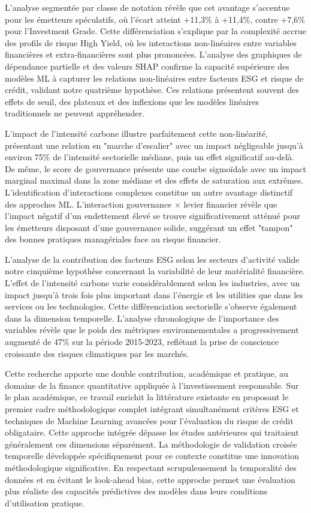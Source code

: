 L'analyse segmentée par classe de notation révèle que cet avantage s'accentue pour les émetteurs spéculatifs, où l'écart atteint +11,3\% à +11,4\%, contre +7,6\% pour l'Investment Grade. Cette différenciation s'explique par la complexité accrue des profils de risque High Yield, où les interactions non-linéaires entre variables financières et extra-financières sont plus prononcées. L'analyse des graphiques de dépendance partielle et des valeurs SHAP confirme la capacité supérieure des modèles ML à capturer les relations non-linéaires entre facteurs ESG et risque de crédit, validant notre quatrième hypothèse. Ces relations présentent souvent des effets de seuil, des plateaux et des inflexions que les modèles linéaires traditionnels ne peuvent appréhender.

L'impact de l'intensité carbone illustre parfaitement cette non-linéarité, présentant une relation en "marche d'escalier" avec un impact négligeable jusqu'à environ 75\% de l'intensité sectorielle médiane, puis un effet significatif au-delà. De même, le score de gouvernance présente une courbe sigmoïdale avec un impact marginal maximal dans la zone médiane et des effets de saturation aux extrêmes. L'identification d'interactions complexes constitue un autre avantage distinctif des approches ML. L'interaction gouvernance × levier financier révèle que l'impact négatif d'un endettement élevé se trouve significativement atténué pour les émetteurs disposant d'une gouvernance solide, suggérant un effet "tampon" des bonnes pratiques managériales face au risque financier.

L'analyse de la contribution des facteurs ESG selon les secteurs d'activité valide notre cinquième hypothèse concernant la variabilité de leur matérialité financière. L'effet de l'intensité carbone varie considérablement selon les industries, avec un impact jusqu'à trois fois plus important dans l'énergie et les utilities que dans les services ou les technologies. Cette différenciation sectorielle s'observe également dans la dimension temporelle. L'analyse chronologique de l'importance des variables révèle que le poids des métriques environnementales a progressivement augmenté de 47\% sur la période 2015-2023, reflétant la prise de conscience croissante des risques climatiques par les marchés.

Cette recherche apporte une double contribution, académique et pratique, au domaine de la finance quantitative appliquée à l'investissement responsable. Sur le plan académique, ce travail enrichit la littérature existante en proposant le premier cadre méthodologique complet intégrant simultanément critères ESG et techniques de Machine Learning avancées pour l'évaluation du risque de crédit obligataire. Cette approche intégrée dépasse les études antérieures qui traitaient généralement ces dimensions séparément. La méthodologie de validation croisée temporelle développée spécifiquement pour ce contexte constitue une innovation méthodologique significative. En respectant scrupuleusement la temporalité des données et en évitant le look-ahead bias, cette approche permet une évaluation plus réaliste des capacités prédictives des modèles dans leurs conditions d'utilisation pratique.

